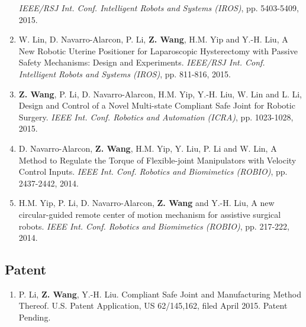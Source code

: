 \documentclass[10pt,letterpaper]{article}
\begin{document}
\begin{enumerate}
        \textit{{IEEE/RSJ} Int. Conf. Intelligent Robots and Systems (IROS)}, pp. 5403-5409, 2015.
        \item W. Lin, D. Navarro-Alarcon, P. Li, \textbf{Z. Wang}, H.M. Yip and Y.-H. Liu,
        A New Robotic Uterine Positioner for Laparoscopic Hysterectomy with Passive Safety Mechanisms: Design and Experiments.
        \textit{{IEEE/RSJ} Int. Conf. Intelligent Robots and Systems (IROS)}, pp. 811-816, 2015.
        \item \textbf{Z. Wang}, P. Li, D. Navarro-Alarcon, H.M. Yip, Y.-H. Liu, W. Lin and L. Li,
        Design and Control of a Novel Multi-state Compliant Safe Joint for Robotic Surgery.
        \textit{{IEEE} Int. Conf. Robotics and Automation (ICRA)}, pp. 1023-1028, 2015.
        \item D. Navarro-Alarcon, \textbf{Z. Wang}, H.M. Yip, Y. Liu, P. Li and W. Lin,
        A Method to Regulate the Torque of Flexible-joint Manipulators with Velocity Control Inputs.
        \textit{{IEEE} Int. Conf. Robotics and Biomimetics (ROBIO)}, pp. 2437-2442, 2014.
        \item H.M. Yip, P. Li, D. Navarro-Alarcon, \textbf{Z. Wang} and Y.-H. Liu,
        A new circular-guided remote center of motion mechanism for assistive surgical robots.
        \textit{{IEEE} Int. Conf. Robotics and Biomimetics (ROBIO)}, pp. 217-222, 2014.
    \end{enumerate}

    \subsection*{Patent}
    \begin{enumerate}
        \item P. Li, \textbf{Z. Wang}, Y.-H. Liu.
        Compliant Safe Joint and Manufacturing Method Thereof.
        U.S. Patent Application, US 62/145,162, filed April 2015. Patent Pending.
    \end{enumerate}


    
\end{document}
